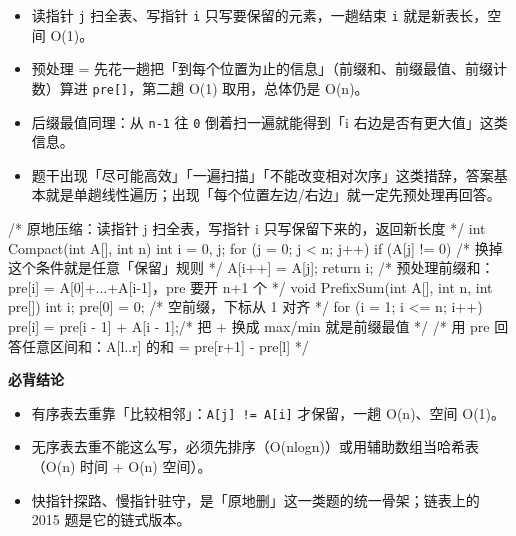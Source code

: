 \documentclass[10pt,a4paper]{ctexart}
\begin{document}
\begin{itemize}

\item 读指针 \texttt{j} 扫全表、写指针 \texttt{i} 只写要保留的元素，一趟结束 \texttt{i} 就是新表长，空间 O(1)。

\item 预处理 = 先花一趟把「到每个位置为止的信息」（前缀和、前缀最值、前缀计数）算进 \texttt{pre[]}，第二趟 O(1) 取用，总体仍是 O(n)。

\item 后缀最值同理：从 \texttt{n-1} 往 \texttt{0} 倒着扫一遍就能得到「i 右边是否有更大值」这类信息。

\item 题干出现「尽可能高效」「一遍扫描」「不能改变相对次序」这类措辞，答案基本就是单趟线性遍历；出现「每个位置左边/右边」就一定先预处理再回答。

\end{itemize}

\begin{codebox}
/* 原地压缩：读指针 j 扫全表，写指针 i 只写保留下来的，返回新长度 */
int Compact(int A[], int n) {
    int i = 0, j;
    for (j = 0; j < n; j++)
        if (A[j] != 0)                 /* 换掉这个条件就是任意「保留」规则 */
            A[i++] = A[j];
    return i;
}
/* 预处理前缀和：pre[i] = A[0]+...+A[i-1]，pre 要开 n+1 个 */
void PrefixSum(int A[], int n, int pre[]) {
    int i;
    pre[0] = 0;                        /* 空前缀，下标从 1 对齐 */
    for (i = 1; i <= n; i++)
        pre[i] = pre[i - 1] + A[i - 1];/* 把 + 换成 max/min 就是前缀最值 */
}
/* 用 pre 回答任意区间和：A[l..r] 的和 = pre[r+1] - pre[l] */
\end{codebox}




\textbf{必背结论}

\begin{itemize}

\item 有序表去重靠「比较相邻」：\texttt{A[j] != A[i]} 才保留，一趟 O(n)、空间 O(1)。

\item 无序表去重不能这么写，必须先排序（O(nlogn)）或用辅助数组当哈希表（O(n) 时间 + O(n) 空间）。

\item 快指针探路、慢指针驻守，是「原地删」这一类题的统一骨架；链表上的 2015 题是它的链式版本。

\end{itemize}
\end{document}
